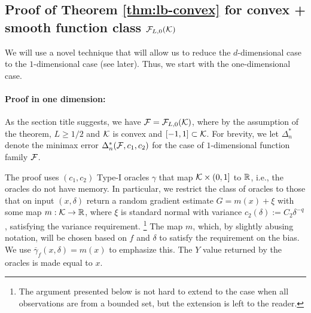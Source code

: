 \subsection{Proof of Theorem \ref{thm:lb-convex} for convex + smooth function class $\mathcal{F}_{L,0}(\mathcal{K})$}
\label{sec:appendix-lbconvex}
We will use a novel technique that will allow us to  reduce the $d$-dimensional case to the $1$-dimensional case (see later).
Thus, we start with the one-dimensional case.

\paragraph{Proof in one dimension:}
As the section title suggests, we have $\mathcal{F} = \mathcal{F}_{L,0}(\mathcal{K})$, where 
by the assumption of the theorem, $L\ge 1/2$ and $\mathcal{K}$ is convex and $[-1,1]\subset \mathcal{K}$.
For brevity, we let $\Delta_n^{*}$ denote the minimax error $\Delta_n^*(\mathcal{F}, c_1,c_2)$ for the case of $1$-dimensional function family $\mathcal{F}$.

The proof uses $(c_1,c_2)$ Type-I oracles $\gamma$ that map $\mathcal{K}\times (0,1]$ to $\mathbb{R}$, i.e., the oracles do not have memory.
In particular, we restrict the class of oracles to those that on input $(x,\delta)$ return 
a random gradient estimate $G = m(x) + \xi$ with some map $m: \mathcal{K} \to \mathbb{R}$,
where $\xi$ is standard normal with variance $c_2(\delta):= C_2 \delta^{-q}$, satisfying the variance requirement.%
\footnote{The argument presented below is not hard to extend to the case when all observations are from a bounded set,
but the extension is left to the reader.}
The map $m$, which, by slightly abusing notation, will be chosen based on $f$ and $\delta$ to satisfy the requirement on the bias. 
We  use $\overline{\gamma}_f(x,\delta) = m(x)$ to emphasize this.
The $Y$ value returned by the oracles is made equal to $x$.


